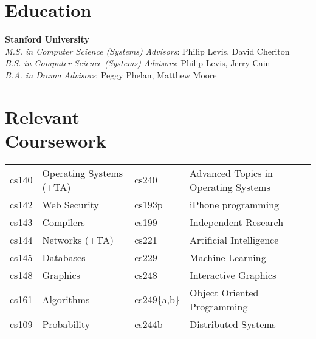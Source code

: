 \documentclass[margin,line]{resume}
\begin{document}
\begin{resume}


    \section{\mysidestyle Education}

    \textbf{Stanford University} \vspace{2mm}\\\vspace{1mm}%
    \textsl{M.S. in Computer Science (Systems)}  \hfill \emph{Advisors}: Philip Levis, David Cheriton\\
    \textsl{B.S. in Computer Science (Systems)}  \hfill \emph{Advisors}: Philip Levis, Jerry Cain\\
    \textsl{B.A. in Drama} \hfill \emph{Advisors}: Peggy Phelan, Matthew Moore

    \section{\mysidestyle Relevant \\ Coursework}
    \begin{tabular}{llll}
cs140  & Operating Systems (+TA) \hspace{0.15\textwidth}
                             &  cs240  & Advanced Topics in Operating Systems \\
cs142  & Web Security        &  cs193p & iPhone programming     \\
cs143  & Compilers           &  cs199  & Independent Research    \\
cs144  & Networks (+TA)      &  cs221  & Artificial Intelligence \\
cs145  & Databases           &  cs229  & Machine Learning        \\
cs148  & Graphics            &  cs248  & Interactive Graphics  \\
cs161  & Algorithms          &  cs249\{a,b\} & Object Oriented Programming \\
cs109  & Probability         &  cs244b & Distributed Systems    \\
    \end{tabular}



\end{resume}
\end{document}
